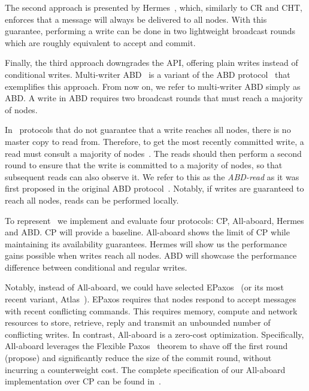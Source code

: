 The second approach is presented by Hermes~\cite{A:2020}, which, similarly to CR and CHT, 
enforces that a message will always be delivered to all nodes. With this guarantee, performing a write can be done in two lightweight broadcast rounds which are roughly equivalent to accept and commit. %


Finally, the third approach downgrades the API, offering plain writes instead of conditional writes.
Multi-writer ABD~\cite{Lynch:1997} is a variant of the ABD protocol~\cite{Attiya:1994} that exemplifies this approach. From now on, we refer to multi-writer ABD simply as ABD. 
A write in ABD requires two broadcast rounds that must reach a majority of nodes.

In \DPKO~protocols that do not guarantee that a write reaches all nodes, 
there is no master copy to read from. 
Therefore, to get the most recently committed write, a read must consult a majority of nodes~\cite{Charapko:2019}. The reads should then perform a second round to ensure that the write is committed to a majority of nodes, so that subsequent reads can also observe it. 
We refer to this as the \emph{ABD-read} as it was first proposed in the original ABD protocol~\cite{Attiya:1994}. Notably, if writes are guaranteed to reach all nodes, reads can be performed locally.

To represent \DPKO~we implement and evaluate four protocols: CP, All-aboard, Hermes and ABD. CP will provide a baseline. 
All-aboard shows the limit of CP while maintaining its availability guarantees.
Hermes will show us the performance gains possible when writes reach all nodes. ABD will showcase the performance difference between conditional and regular writes. 

Notably, instead of All-aboard, we could have selected EPaxos~\cite{Moraru:2013} (or its most recent variant, Atlas~\cite{Enes:2020}). EPaxos requires that nodes respond to accept messages with recent conflicting commands. This requires memory, compute and network resources to store, retrieve, reply and transmit an unbounded number of conflicting writes.
In contrast, All-aboard is a zero-cost optimization. 
Specifically, All-aboard leverages the Flexible Paxos~\cite{Howard:2018} theorem to shave off the first round (propose) and significantly reduce the size of the commit round, without incurring a counterweight cost.
The complete specification of our All-aboard implementation over CP can be found in~\cite{Paxos-spec}.





